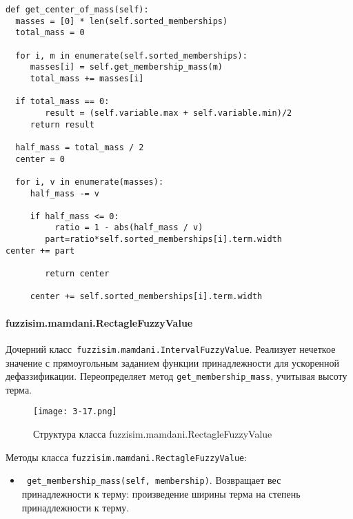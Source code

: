 \begin{lstlisting}[style=pythonstyle,caption={  }, label=lst:func:1]
def get_center_of_mass(self):
  masses = [0] * len(self.sorted_memberships)
  total_mass = 0

  for i, m in enumerate(self.sorted_memberships):
     masses[i] = self.get_membership_mass(m)
     total_mass += masses[i]

  if total_mass == 0:
		result = (self.variable.max + self.variable.min)/2
     return result

  half_mass = total_mass / 2
  center = 0

  for i, v in enumerate(masses):
     half_mass -= v

     if half_mass <= 0:
          ratio = 1 - abs(half_mass / v)
  		part=ratio*self.sorted_memberships[i].term.width
center += part

        return center

     center += self.sorted_memberships[i].term.width
\end{lstlisting}








\paragraph{fuzzisim.mamdani.RectagleFuzzyValue}

Дочерний класс\lstinline! fuzzisim.mamdani.IntervalFuzzyValue!. Реализует нечеткое значение с прямоугольным заданием функции принадлежности для ускоренной дефаззификации. Переопределяет метод \lstinline!get_membership_mass!, учитывая высоту терма.

\begin{figure}[ht]
	\centering
	\texttt{[image: 3-17.png]}
	\caption{ Структура класса fuzzisim.mamdani.RectagleFuzzyValue}
\end{figure}


Методы класса \lstinline!fuzzisim.mamdani.RectagleFuzzyValue!:
\begin{itemize}
	\item \lstinline! get_membership_mass(self, membership)!. Возвращает вес принадлежности к терму: произведение ширины терма на степень принадлежности к терму.
\end{itemize}







